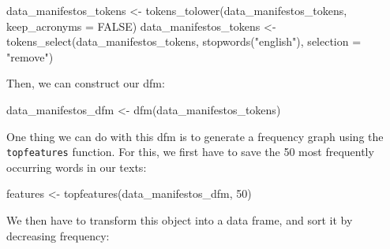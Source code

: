 \documentclass[
]{book}
\newenvironment{Shaded}{\begin{snugshade}}{\end{snugshade}}
\newcommand{\AttributeTok}[1]{\textcolor[rgb]{0.77,0.63,0.00}{#1}}
\newcommand{\ConstantTok}[1]{\textcolor[rgb]{0.00,0.00,0.00}{#1}}
\newcommand{\DecValTok}[1]{\textcolor[rgb]{0.00,0.00,0.81}{#1}}
\newcommand{\FunctionTok}[1]{\textcolor[rgb]{0.00,0.00,0.00}{#1}}
\newcommand{\NormalTok}[1]{#1}
\newcommand{\OtherTok}[1]{\textcolor[rgb]{0.56,0.35,0.01}{#1}}
\newcommand{\SpecialCharTok}[1]{\textcolor[rgb]{0.00,0.00,0.00}{#1}}
\newcommand{\StringTok}[1]{\textcolor[rgb]{0.31,0.60,0.02}{#1}}
\begin{document}
\begin{Shaded}
\begin{Highlighting}[]
\NormalTok{data\_manifestos\_tokens }\OtherTok{\textless{}{-}} \FunctionTok{tokens\_tolower}\NormalTok{(data\_manifestos\_tokens, }\AttributeTok{keep\_acronyms =} \ConstantTok{FALSE}\NormalTok{)}
\NormalTok{data\_manifestos\_tokens }\OtherTok{\textless{}{-}} \FunctionTok{tokens\_select}\NormalTok{(data\_manifestos\_tokens, }\FunctionTok{stopwords}\NormalTok{(}\StringTok{"english"}\NormalTok{), }\AttributeTok{selection =} \StringTok{"remove"}\NormalTok{)}
\end{Highlighting}
\end{Shaded}

Then, we can construct our dfm:

\begin{Shaded}
\begin{Highlighting}[]
\NormalTok{data\_manifestos\_dfm }\OtherTok{\textless{}{-}} \FunctionTok{dfm}\NormalTok{(data\_manifestos\_tokens)}
\end{Highlighting}
\end{Shaded}

One thing we can do with this dfm is to generate a frequency graph using the \texttt{topfeatures} function. For this, we first have to save the 50 most frequently occurring words in our texts:

\begin{Shaded}
\begin{Highlighting}[]
\NormalTok{features }\OtherTok{\textless{}{-}} \FunctionTok{topfeatures}\NormalTok{(data\_manifestos\_dfm, }\DecValTok{50}\NormalTok{)}
\end{Highlighting}
\end{Shaded}

We then have to transform this object into a data frame, and sort it by decreasing frequency:

\begin{Shaded}
\end{Shaded}
\end{document}

